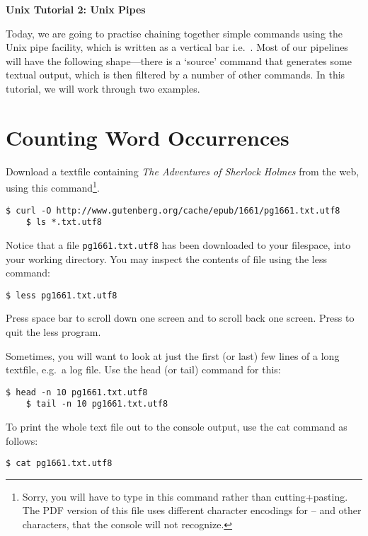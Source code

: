 \documentclass{article}
\begin{document}
\noindent
{\Large \textsf{\textbf{Unix Tutorial 2: Unix Pipes}}}

\bigskip


Today, we are going to practise chaining together simple commands using the Unix pipe facility, which is written as a vertical bar i.e.\ \textbar.
Most of our pipelines will have the following shape---there is a `source' command that generates some textual output, which is then filtered by a number of other commands. In this tutorial, we will work through two examples.

\section*{Counting Word Occurrences}

Download a textfile containing \textit{The Adventures of Sherlock Holmes} from the web, using this command\footnote{Sorry, you will have to type in this command rather than cutting+pasting. The PDF version of this file uses different character encodings for -- and other characters, that the console will not recognize.}.
\begin{lstlisting}[style=BashInputStyle]
    $ curl -O http://www.gutenberg.org/cache/epub/1661/pg1661.txt.utf8
    $ ls *.txt.utf8
\end{lstlisting}

Notice that a file \texttt{pg1661.txt.utf8} has been downloaded to your filespace, into your working directory. You may inspect the contents of file using the less command:

\begin{lstlisting}[style=BashInputStyle]
    $ less pg1661.txt.utf8
\end{lstlisting}

Press space bar to scroll down one screen and  to scroll back one screen. Press  to quit the less program.

Sometimes, you will want to look at just the first (or last) few lines of a long textfile, e.g.\ a log file. Use the head (or tail) command for this:

\begin{lstlisting}[style=BashInputStyle]
    $ head -n 10 pg1661.txt.utf8
    $ tail -n 10 pg1661.txt.utf8
\end{lstlisting}

To print the whole text file out to the console output, use the cat command as follows:

\begin{lstlisting}[style=BashInputStyle]
    $ cat pg1661.txt.utf8
\end{lstlisting}
\end{document}

